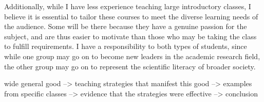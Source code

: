 \documentclass[11pt,letterpaper,sans]{moderncv} %
\begin{document}
Additionally, while I have less experience teaching large introductory classes, I believe it is essential to tailor these courses to meet the diverse learning needs of the audience. Some will be there because they have a genuine passion for the subject, and are thus easier to motivate than those who may be taking the class to fulfill requirements. I have a responsibility to both types of students, since while one group may go on to become new leaders in the academic research field, the other group may go on to represent the scientific literacy of broader society. 

wide general good --> teaching strategies that manifest this good --> examples from specific classes --> evidence that the strategies were effective --> conclusion
\end{document}

